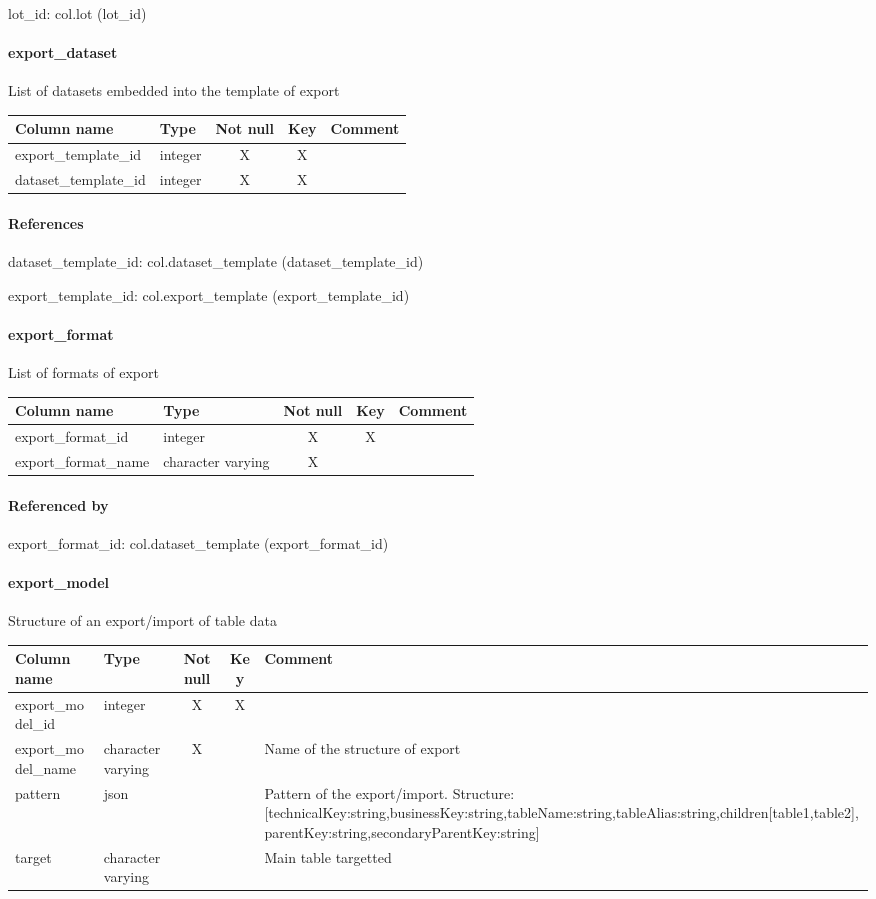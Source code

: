 lot\_id: col.lot (lot\_id)

\paragraph{export\_dataset}
List of datasets embedded into the template of export

\begin{tabular}{|l| p{2cm}|c|c| p{5cm}|}
\hline
Column name & Type & Not null & Key & Comment \\
\hline
export\_template\_id & integer & X & X & \\
dataset\_template\_id & integer & X & X & \\
\hline
\end{tabular}
\paragraph{References}
dataset\_template\_id: col.dataset\_template (dataset\_template\_id)

export\_template\_id: col.export\_template (export\_template\_id)

\paragraph{export\_format}
List of formats of export

\begin{tabular}{|l| p{2cm}|c|c| p{5cm}|}
\hline
Column name & Type & Not null & Key & Comment \\
\hline
export\_format\_id & integer & X & X & \\
export\_format\_name & character varying & X &  & \\
\hline
\end{tabular}
\paragraph{Referenced by}
export\_format\_id: col.dataset\_template (export\_format\_id)

\paragraph{export\_model}
Structure of an export/import of table data

\begin{tabular}{|l| p{2cm}|c|c| p{5cm}|}
\hline
Column name & Type & Not null & Key & Comment \\
\hline
export\_model\_id & integer & X & X & \\
export\_model\_name & character varying & X &  & Name of the structure of export\\
pattern & json &  &  & Pattern of the export/import.
Structure:
[{technicalKey:string,businessKey:string,tableName:string,tableAlias:string,children[table1,table2],parentKey:string,secondaryParentKey:string}]\\
target & character varying &  &  & Main table targetted\\
\hline
\end{tabular}
